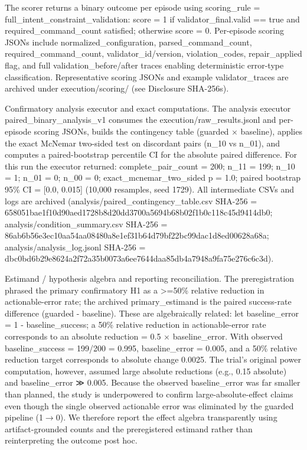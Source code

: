 \documentclass[conference]{IEEEtran}
\begin{document}
The scorer returns a binary outcome per episode using scoring\_rule = full\_intent\_constraint\_validation: score = 1 if validator\_final.valid == true and required\_command\_count satisfied; otherwise score = 0. Per-episode scoring JSONs include normalized\_configuration, parsed\_command\_count, required\_command\_count, validator\_id/version, violation\_codes, repair\_applied flag, and full validation\_before/after traces enabling deterministic error-type classification. Representative scoring JSONs and example validator\_traces are archived under execution/scoring/ (see Disclosure SHA-256s).

Confirmatory analysis executor and exact computations. The analysis executor paired\_binary\_analysis\_v1 consumes the execution/raw\_results.jsonl and per-episode scoring JSONs, builds the contingency table (guarded \ensuremath{\times} baseline), applies the exact McNemar two-sided test on discordant pairs (n\_10 vs n\_01), and computes a paired-bootstrap percentile CI for the absolute paired difference. For this run the executor returned: complete\_pair\_count = 200; n\_11 = 199; n\_10 = 1; n\_01 = 0; n\_00 = 0; exact\_mcnemar\_two\_sided p = 1.0; paired bootstrap 95\% CI = [0.0, 0.015] (10,000 resamples, seed 1729). All intermediate CSVs and logs are archived (analysis/paired\_contingency\_table.csv SHA-256 = 658051bae1f10d90aed1728b8d20dd3700a5694b68b02f1b0c118c45d9414db0; analysis/condition\_summary.csv SHA-256 = 86ab6b56e3ec10aa54aa08480a8e1ef31b64d79bf22bc99dac1d8ed00628a68a; analysis/analysis\_log.jsonl SHA-256 = dbc0bd6b29e8624a2f72a35b0073a6ee7644daa85db4a7948a9fa75e276c6c3d).

Estimand / hypothesis algebra and reporting reconciliation. The preregistration phrased the primary confirmatory H1 as a >=50\% relative reduction in actionable-error rate; the archived primary\_estimand is the paired success-rate difference (guarded - baseline). These are algebraically related: let baseline\_error = 1 - baseline\_success; a 50\% relative reduction in actionable-error rate corresponds to an absolute reduction = 0.5 \ensuremath{\times} baseline\_error. With observed baseline\_success = 199/200 = 0.995, baseline\_error = 0.005, and a 50\% relative reduction target corresponds to absolute change 0.0025. The trial's original power computation, however, assumed large absolute reductions (e.g., 0.15 absolute) and baseline\_error ≫ 0.005. Because the observed baseline\_error was far smaller than planned, the study is underpowered to confirm large-absolute-effect claims even though the single observed actionable error was eliminated by the guarded pipeline (1\ensuremath{\rightarrow}0). We therefore report the effect algebra transparently using artifact-grounded counts and the preregistered estimand rather than reinterpreting the outcome post hoc.
\end{document}
